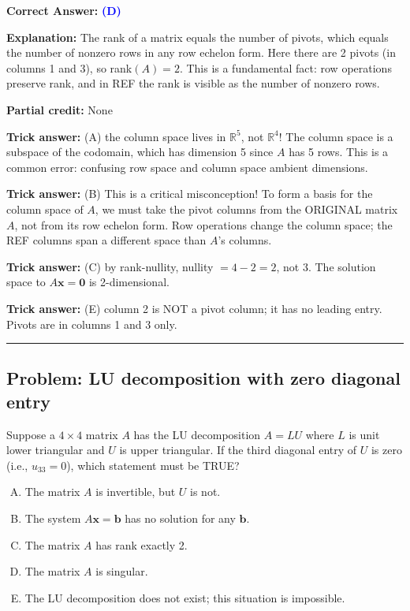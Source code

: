\documentclass[12pt]{amsart}
\newcommand{\divider}{
  \vspace{-1em}
  \noindent
  \raisebox{-0.15ex}{\textbullet}%
  \hspace{0.5em}%
  \rule[0.5ex]{0.95\textwidth}{1.0pt}%
  \hspace{0.5em}%
  \raisebox{-0.15ex}{\textbullet}%
  \vspace{0em}
}
\begin{document}
\textbf{Correct Answer:} \textcolor{blue}{\textbf{(D)}}

\textbf{Explanation:} The rank of a matrix equals the number of pivots, which equals the number of nonzero rows in any row echelon form. Here there are 2 pivots (in columns 1 and 3), so rank$(A) = 2$. This is a fundamental fact: row operations preserve rank, and in REF the rank is visible as the number of nonzero rows.

\textbf{Partial credit:} None

\textbf{Trick answer:} (A) the column space lives in $\mathbb{R}^5$, not $\mathbb{R}^4$! The column space is a subspace of the codomain, which has dimension 5 since $A$ has 5 rows. This is a common error: confusing row space and column space ambient dimensions.

\textbf{Trick answer:} (B) This is a critical misconception! To form a basis for the column space of $A$, we must take the pivot columns from the ORIGINAL matrix $A$, not from its row echelon form. Row operations change the column space; the REF columns span a different space than $A$'s columns.

\textbf{Trick answer:} (C) by rank-nullity, nullity $= 4 - 2 = 2$, not 3. The solution space to $A\mathbf{x} = \mathbf{0}$ is 2-dimensional.

\textbf{Trick answer:} (E) column 2 is NOT a pivot column; it has no leading entry. Pivots are in columns 1 and 3 only.

\divider

\subsection*{Problem: LU decomposition with zero diagonal entry}

Suppose a $4 \times 4$ matrix $A$ has the LU decomposition $A = LU$ where $L$ is unit lower triangular and $U$ is upper triangular. If the third diagonal entry of $U$ is zero (i.e., $u_{33} = 0$), which statement must be TRUE?

\begin{enumerate}[(A)]
\item The matrix $A$ is invertible, but $U$ is not.
\item The system $A\mathbf{x} = \mathbf{b}$ has no solution for any $\mathbf{b}$.
\item The matrix $A$ has rank exactly 2.
\item The matrix $A$ is singular.
\item The LU decomposition does not exist; this situation is impossible.
\end{enumerate}
\end{document}

